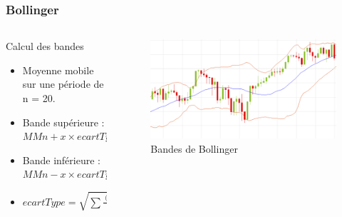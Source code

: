 \begin{frame}
    \frametitle{Bollinger}
    \begin{columns}
      \begin{column}{5cm}
	  \begin{block}{Calcul des bandes}
		\begin{itemize}
		\item Moyenne mobile sur une période de n = 20.
		\item Bande supérieure : $MMn + x \times ecartType$
		\item Bande inférieure : $MMn - x \times ecartType$
		\item $ecartType= \sqrt{\sum{\frac{(cloture-MMn)^2}{n}}}$
		\end{itemize}
	  \end{block}
      \end{column}
    \begin{column}{5cm}
	\begin{figure}
	      \includegraphics[scale=0.25]{images/bollinger.png}
	      \caption{Bandes de Bollinger}
	  \end{figure}   
	\end{column}
    \end{columns}
\end{frame}

